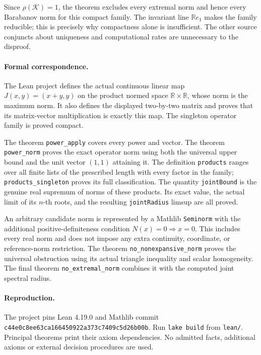 \documentclass[11pt]{article}
\begin{document}
Since $\rho(\mathcal K)=1$, the theorem excludes every extremal norm and hence every Barabanov norm for this compact family. The invariant line $\mathbb R e_1$ makes the family reducible; this is precisely why compactness alone is insufficient. The other source conjuncts about uniqueness and computational rates are unnecessary to the disproof.

\paragraph{Formal correspondence.}
The Lean project defines the actual continuous linear map $J(x,y)=(x+y,y)$ on the product normed space $\mathbb R\times\mathbb R$, whose norm is the maximum norm. It also defines the displayed two-by-two matrix and proves that its matrix-vector multiplication is exactly this map. The singleton operator family is proved compact.

The theorem \texttt{power\_apply} covers every power and vector. The theorem \texttt{power\_norm} proves the exact operator norm using both the universal upper bound and the unit vector $(1,1)$ attaining it. The definition \texttt{products} ranges over all finite lists of the prescribed length with every factor in the family; \texttt{products\_singleton} proves its full classification. The quantity \texttt{jointBound} is the genuine real supremum of norms of these products. Its exact value, the actual limit of its $n$-th roots, and the resulting \texttt{jointRadius} limsup are all proved.

An arbitrary candidate norm is represented by a Mathlib \texttt{Seminorm} with the additional positive-definiteness condition $N(x)=0\Rightarrow x=0$. This includes every real norm and does not impose any extra continuity, coordinate, or reference-norm restriction. The theorem \texttt{no\_nonexpansive\_norm} proves the universal obstruction using its actual triangle inequality and scalar homogeneity. The final theorem \texttt{no\_extremal\_norm} combines it with the computed joint spectral radius.

\paragraph{Reproduction.}
The project pins Lean 4.19.0 and Mathlib commit \texttt{c44e0c8ee63ca166450922a373c7409c5d26b00b}. Run \texttt{lake build} from \texttt{lean/}. Principal theorems print their axiom dependencies. No admitted facts, additional axioms or external decision procedures are used.
\end{document}
